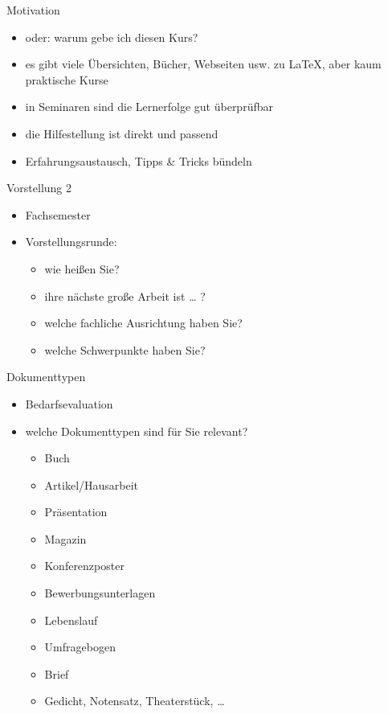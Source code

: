 \begin{frame}{Motivation}

\begin{itemize}
\itemsep1pt\parskip0pt
\item
  oder: warum gebe ich diesen Kurs?
\item
  es gibt viele Übersichten, Bücher, Webseiten usw. zu \LaTeX, aber kaum
  praktische Kurse
\item
  in Seminaren sind die Lernerfolge gut überprüfbar
\item
  die Hilfestellung ist direkt und passend
\item
  Erfahrungsaustausch, Tipps \& Tricks bündeln
\end{itemize}

\end{frame}

\begin{frame}{Vorstellung 2}

\begin{itemize}
\itemsep1pt\parskip0pt
\item
  Fachsemester
\item
  Vorstellungsrunde:

  \begin{itemize}
  \itemsep1pt\parskip0pt
  \item
    wie heißen Sie?
  \item
    ihre nächste große Arbeit ist \ldots{} ?
  \item
    welche fachliche Ausrichtung haben Sie?
  \item
    welche Schwerpunkte haben Sie?
  \end{itemize}
\end{itemize}

\end{frame}

\begin{frame}{Dokumenttypen}

\begin{itemize}
\itemsep1pt\parskip0pt
\item
  Bedarfsevaluation
\item
  welche Dokumenttypen sind für Sie relevant?

  \begin{itemize}
  \itemsep1pt\parskip0pt
  \item
    Buch
  \item
    Artikel/Hausarbeit
  \item
    Präsentation
  \item
    Magazin
  \item
    Konferenzposter
  \item
    Bewerbungsunterlagen
  \item
    Lebenslauf
  \item
    Umfragebogen
  \item
    Brief
  \item
    Gedicht, Notensatz, Theaterstück, \ldots{}
  \end{itemize}
\end{itemize}

\end{frame}

